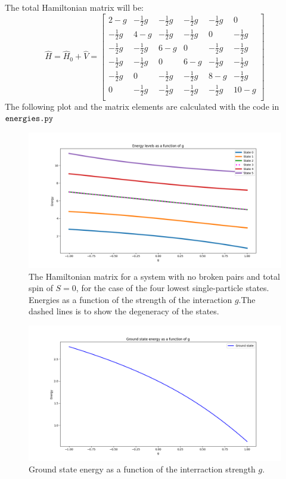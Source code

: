 \documentclass[a4paper,12pt]{article}
\begin{document}
The total Hamiltonian matrix will be:
$$
\hat{H} = \hat{H}_0 + \hat{V} = 
\begin{bmatrix}
    2 - g & -\frac{1}{2}g & -\frac{1}{2}g & -\frac{1}{2}g & -\frac{1}{2}g & 0 \\
    -\frac{1}{2}g & 4 - g & -\frac{1}{2}g & -\frac{1}{2}g & 0 & -\frac{1}{2}g \\
    -\frac{1}{2}g & -\frac{1}{2}g & 6 - g & 0 & -\frac{1}{2}g & -\frac{1}{2}g \\
    -\frac{1}{2}g & -\frac{1}{2}g & 0 & 6 - g & -\frac{1}{2}g & -\frac{1}{2}g \\
    -\frac{1}{2}g & 0 & -\frac{1}{2}g & -\frac{1}{2}g & 8 - g & -\frac{1}{2}g \\
    0 & -\frac{1}{2}g & -\frac{1}{2}g & -\frac{1}{2}g & -\frac{1}{2}g & 10 - g \\
\end{bmatrix}
$$
The following plot and the matrix elements are calculated with the code in $ \verb|energies.py|$
\begin{figure}[h]
    \centering
    \includegraphics[scale = 0.5]{Figure_1.png}
    \caption{The Hamiltonian matrix for a system with no broken pairs and total spin of $S=0$, for the case of the four lowest single-particle states. Energies as a function of the strength of the interaction $g$.The dashed lines is to show the degeneracy of the states.}
    \label{fig:fig1}
\end{figure}
\begin{figure}[h]
    \centering
    \includegraphics[scale = 0.5]{Figure_2.png}
    \caption{Ground state energy as a function of the interraction strength $g$.}
    \label{fig:fig2}
\end{figure}
\end{document}

